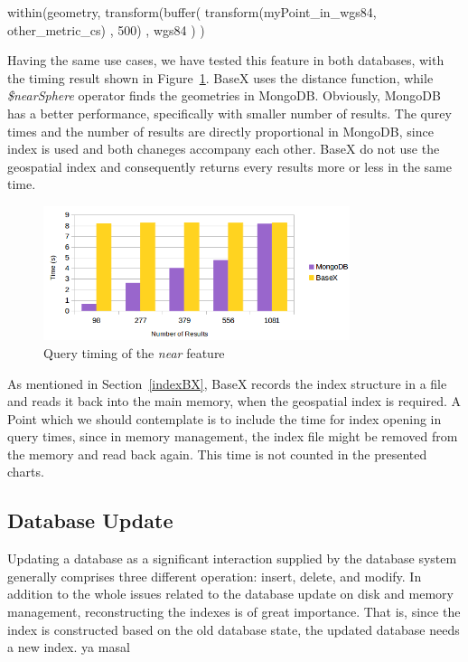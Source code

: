 \documentclass[a4paper,12pt]{article}
\begin{document}
\vspace{10px}
\begin{fakeJSON} 
within(geometry,
       transform(buffer(
                   transform(myPoint_in_wgs84, other_metric_cs)
                   , 500)
                 , wgs84
                )
      )
\end{fakeJSON}
\vspace{10px}
Having the same use cases, we have tested this feature in both databases, with the timing result shown in Figure~\ref{figBXvsMongoNear}. BaseX uses the distance function, while \textit{\$nearSphere} operator finds the geometries in MongoDB. Obviously, MongoDB has a better performance, specifically with smaller number of results. The qurey times and the number of results are directly proportional in MongoDB, since index is used and both chaneges accompany each other. BaseX do not use the geospatial index and consequently returns every results more or less in the same time.



\begin{figure}
\centering
\includegraphics[width=0.8\textwidth]{BXvsMongoNear.png}
\caption{Query timing of the \textit{near} feature}
\label{figBXvsMongoNear}
\end{figure}


As mentioned in Section~\ref{indexBX}, BaseX records the index structure in a file and reads it back into the main memory, when the geospatial index is required. A Point which we should contemplate is to include the time for index opening in query times, since in memory management, the index file might be removed from the memory and read back again. This time is not counted in the presented charts.


\subsection{Database Update}
\label{update}
Updating a database as a significant interaction supplied by the database system generally comprises three different operation: insert, delete, and modify. In addition to the whole issues related to the database update on disk and memory management, reconstructing the indexes is of great importance. That is, since the index is constructed based on the old database state, the updated database needs a new index. ya masal
\end{document}
